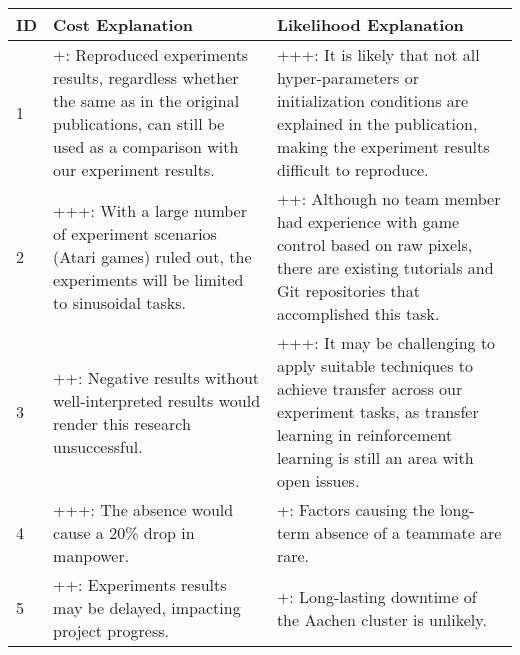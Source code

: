 \begin{center} 
	\small
	\begin{tabular}{  p{} p{} p{}}
		\toprule
		\textbf{ID} & \textbf{Cost Explanation} & \textbf{Likelihood Explanation} 		 \\ 
		\midrule
		1 &
		+: Reproduced experiments results, regardless whether the same as in the original publications, can still be used as a comparison with our experiment results.  &
		+++: It is likely that not all hyper-parameters or initialization conditions are explained in the publication, making the experiment results difficult to reproduce. \\
		2 &
		+++: With a large number of experiment scenarios (Atari games) ruled out, the experiments will be limited to sinusoidal tasks. &
		++: Although no team member had experience with game control based on raw pixels, there are existing tutorials and Git repositories that accomplished this task. \\
		3 &
		++: Negative results without well-interpreted results would render this research unsuccessful. &
		+++: It may be challenging to apply suitable techniques	to achieve transfer across our experiment tasks, as transfer learning in reinforcement learning is still an area with open issues. \\
		4 &
		+++: The absence would cause a 20\% drop in manpower.  &
		+: Factors causing the long-term absence of a teammate are rare. \\
		
		5 &
		++: Experiments results may be delayed, impacting project progress.  &
		+: Long-lasting downtime of the Aachen cluster is unlikely. \\
		
		\bottomrule
	\end{tabular}
\label{tbl:risk_explained}
\end{center}